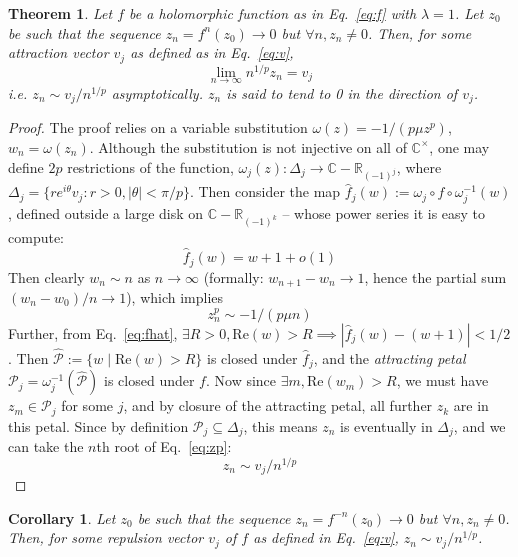 \documentclass{article}
\newtheorem{thm}{Theorem}
\newtheorem{cor}{Corollary}
\begin{document}
\begin{thm}
    \label{thm:arvec-ir}
    Let $f$ be a holomorphic function as in Eq.~\ref{eq:f} with $\lambda = 1$. Let $z_0$ be such that the sequence $z_n=f^n(z_0)\to 0$ but $\forall n, z_n\ne 0$. Then, for some attraction vector $v_j$ as defined as in Eq.~\ref{eq:v},
    \begin{equation*}
        \lim_{n\to\infty} n^{1/p} z_n = v_j
    \end{equation*}
    i.e. $z_n\sim v_j/n^{1/p}$ asymptotically. $z_n$ is said to tend to 0 in the direction of $v_j$.
\end{thm}
\begin{proof}
    The proof relies on a variable substitution $\omega(z)=-1/(p \mu z^p)$, $w_n=\omega(z_n)$. Although the substitution is not injective on all of $\mathbb{C}^{\times}$, one may define $2p$ restrictions of the function, $\omega_j(z):\Delta_j\to\mathbb{C}-\mathbb{R}_{(-1)^j}$, where $\Delta_j=\{re^{i\theta}v_j : r>0, |\theta| < \pi/p \}$. Then consider the map $\hat{f}_j(w):=\omega_j \circ f \circ \omega_j^{-1}(w)$, defined outside a large disk on $\mathbb{C}-\mathbb{R}_{(-1)^k}$ -- whose power series it is easy to compute:
    \begin{equation}
        \label{eq:fhat}
        \hat{f}_j(w) = w + 1 + o(1)
    \end{equation}
    Then clearly $w_n\sim n$ as $n\to\infty$ (formally: $w_{n+1}-w_n\to 1$, hence the partial sum $(w_n-w_0)/n\to 1$), which implies 
    \begin{equation}
        \label{eq:zp}
        z_n^p\sim -1/(p\mu n)
    \end{equation}
    Further, from Eq.~\ref{eq:fhat}, $\exists R > 0, \mathrm{Re}(w)>R \implies |\hat{f}_j(w)-(w+1)|<1/2$. Then $\hat{\mathcal{P}}:=\{w\mid\mathrm{Re}(w)>R\}$ is closed under $\hat{f}_j$, and the \textit{attracting petal} $\mathcal{P}_j=\omega_j^{-1}\left(\hat{\mathcal{P}}\right)$ is closed under $f$. Now since $\exists m, \mathrm{Re}(w_m)>R$, we must have $z_m\in \mathcal{P}_j$ for some $j$, and by closure of the attracting petal, all further $z_k$ are in this petal. Since by definition $\mathcal{P}_j\subseteq\Delta_j$, this means $z_n$ is eventually in $\Delta_j$, and we can take the $n$th root of Eq.~\ref{eq:zp}:
    \begin{equation}
        \label{eq:z}
        z_n \sim v_j/n^{1/p}
    \end{equation}
\end{proof}
\begin{cor}
    \label{cor:arvec-ir-inv}
    Let $z_0$ be such that the sequence $z_n=f^{-n}(z_0)\to 0$ but $\forall n, z_n\ne 0$. Then, for some repulsion vector $v_j$ of $f$ as defined in Eq.~\ref{eq:v}, $z_n\sim v_j/n^{1/p}$.
\end{cor}
\end{document}
